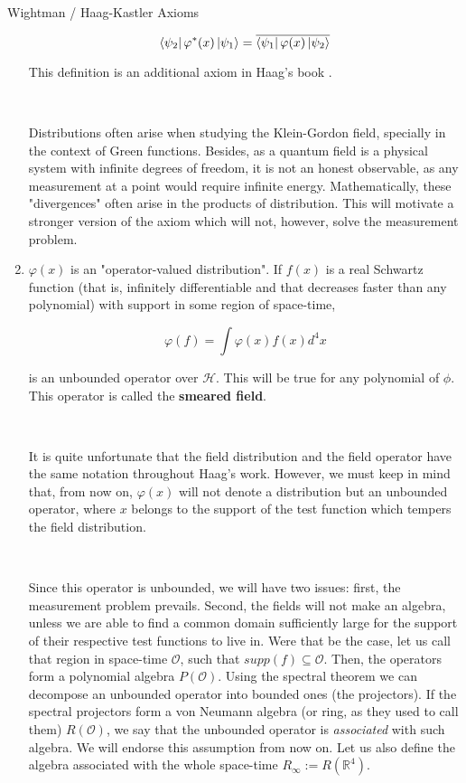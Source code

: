 \documentclass[12pt]{article}
\begin{document}
\begin{section}{Wightman / Haag-Kastler Axioms}
\begin{enumerate}
\begin{equation}
\bra {\psi _2} \varphi ^* (x) \ket{\psi _1} = \overline{\bra{\psi _1} \varphi (x) \ket{\psi _2}}
\end{equation}

This definition is an additional axiom in Haag's book \cite{haag_local_1996}.

\

Distributions often arise when studying the Klein-Gordon field, specially in the context of Green functions. Besides, as a quantum field is a physical system with infinite degrees of freedom, it is not an honest observable, as any measurement at a point would require infinite energy. Mathematically, these "divergences" often arise in the products of distribution. This will motivate a stronger version of the axiom which will not, however, solve the measurement problem.

\item $\varphi (x)$ is an "operator-valued distribution". If $f(x)$ is a real Schwartz function (that is, infinitely differentiable and that decreases faster than any polynomial) with support in some region of space-time,

\begin{equation}
\varphi (f) = \int \varphi (x) f(x) d^4 x
\end{equation}

is an unbounded operator over $\mathcal{H}$. This will be true for any polynomial of $\phi$. This operator is called the \textbf{smeared field}.

\

It is quite unfortunate that the field distribution and the field operator have the same notation throughout Haag's work. However, we must keep in mind that, from now on, $\varphi (x)$ will not denote a distribution but an unbounded operator, where $x$ belongs to the support of the test function which tempers the field distribution.

\

Since this operator is unbounded, we will have two issues: first, the measurement problem prevails. Second, the fields will not make an algebra, unless we are able to find a common domain sufficiently large for the support of their respective test functions to live in. Were that be the case, let us call that region in space-time $\mathcal{O}$, such that $supp(f) \subseteq \mathcal{O}$. Then, the operators form a polynomial algebra $P(\mathcal{O})$. Using the spectral theorem we can decompose an unbounded operator into bounded ones (the projectors). If the spectral projectors form a von Neumann algebra (or ring, as they used to call them) $R(\mathcal{O})$, we say that the unbounded operator is \textit{associated} with such algebra. We will endorse this assumption from now on. Let us also define the algebra associated with the whole space-time $R_{\infty} := R(\mathbb{R}^4)$. 


\end{enumerate}
\end{section}
\end{document}
